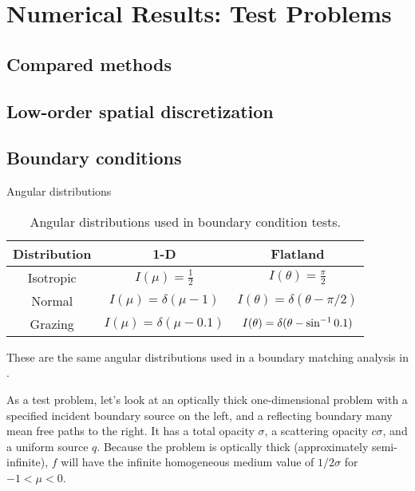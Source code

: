 
\chapter{Numerical Results: Test Problems}\label{chap:simpleNumerical}


\section{Compared methods}

\section{Low-order spatial discretization}

\section{Boundary conditions}

Angular distributions

\begin{table}[htb]
  \centering
  \begin{tabular}{ccc}
\toprule
    Distribution & 1-D & Flatland
\\ \midrule
Isotropic & $I(\mu) = \frac{1}{2}$ & $I(\theta) = \frac{\pi}{2}$
\\
Normal & $I(\mu) = \delta(\mu-1)$ & $I(\theta) = \delta(\theta-\pi/2)$
\\
Grazing & $I(\mu) = \delta(\mu-0.1)$ & $I(\theta) = \delta(\theta-\sin^{-1}0.1)$
\\ \bottomrule
  \end{tabular}
  \caption{Angular distributions used in boundary condition tests.}
  \label{tab:angularDistributions}
\end{table}

These are the same angular distributions used in a boundary matching analysis
in \cite{Dav2006}.

\horizsep

As a test problem, let's look at an optically thick one-dimensional problem
with a specified incident boundary source on the left, and a reflecting
boundary many mean free paths to the right. It has a total opacity $\sigma$, a
scattering opacity $c\sigma$, and a uniform source $q$. Because the problem is
optically thick (approximately semi-infinite), $f$ will have the infinite
homogeneous medium value of $1/2\sigma$ for $-1 < \mu < 0$.

